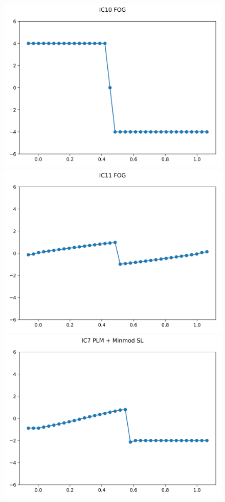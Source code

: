 \documentclass{article}
\begin{document}
\begin{figure}[t]
        \includegraphics[width=.95\textwidth]{../../code/unsafe_IC10Methodfu_plot.png}
        \includegraphics[width=.95\textwidth]{../../code/unsafe_IC11Methodfu_plot.png}
    \emp
        \centering
        \includegraphics[width=.95\textwidth]{../../code/unsafe_IC7Methodpm_plot.png}

\end{figure}
\end{document}
